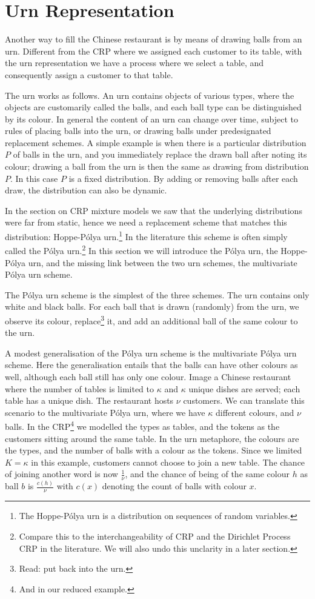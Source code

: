 \section{Urn Representation}
Another way to fill the Chinese restaurant is by means of drawing balls from an urn. Different from the CRP where we assigned each customer to its table, with the urn representation we have a process where we select a table, and consequently assign a customer to that table.

The urn works as follows. An urn contains objects of various types, where the objects are customarily called the balls, and each ball type can be distinguished by its colour. In general the content of an urn can change over time, subject to rules of placing balls into the urn, or drawing balls under predesignated replacement schemes. A simple example is when there is a particular distribution $P$ of balls in the urn, and you immediately replace the drawn ball after noting its colour; drawing a ball from the urn is then the same as drawing from distribution $P$. In this case $P$ is a fixed distribution. By adding or removing balls after each draw, the distribution can also be dynamic.

In the section on CRP mixture models we saw that the underlying distributions were far from static, hence we need a replacement scheme that matches this distribution: Hoppe-P\'olya urn.\footnote{The Hoppe-P\'olya urn is a distribution on sequences of random variables.} In the literature this scheme is often simply called the P\'olya urn.\footnote{Compare this to the interchangeability of CRP and the Dirichlet Process CRP in the literature. We will also undo this unclarity in a later section.} In this section we will introduce the P\'olya urn, the Hoppe-P\'olya urn, and the missing link between the two urn schemes, the multivariate P\'olya urn scheme.

The P\'olya urn scheme\cite{Johnson1977Urn} is the simplest of the three schemes. The urn contains only white and black balls. For each ball that is drawn (randomly) from the urn, we observe its colour,  replace\footnote{Read: put back into the urn.} it, and add an additional ball of the same colour to the urn. 

A modest generalisation of the P\'olya urn scheme is the multivariate P\'olya urn scheme. Here the generalisation entails that the balls can have other colours as well, although each ball still has only one colour. Image a Chinese restaurant where the number of tables is limited to $\kappa$ and $\kappa$ unique dishes are served; each table has a unique dish. The restaurant hosts $\nu$ customers. We can translate this scenario to the multivariate P\'olya urn, where we have $\kappa$ different colours, and $\nu$ balls. In the CRP\footnote{And in our reduced example.} we modelled the types as tables, and the tokens as the customers sitting around the same table. In the urn metaphore, the colours are the types, and the number of balls with a colour as the tokens. Since we limited $K=\kappa$ in this example, customers cannot choose to join a new table. The chance of joining another word is now $\frac{1}{\nu}$, and the chance of being of the same colour $h$ as ball $b$ is $\frac{c(h)}{\nu}$ with $c(x)$ denoting the count of balls with colour $x$. 

